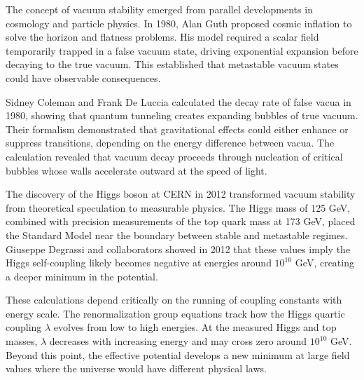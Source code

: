 \begin{historical}
The concept of vacuum stability emerged from parallel developments in cosmology and particle physics. In 1980, Alan Guth proposed cosmic inflation to solve the horizon and flatness problems. His model required a scalar field temporarily trapped in a false vacuum state, driving exponential expansion before decaying to the true vacuum. This established that metastable vacuum states could have observable consequences.

Sidney Coleman and Frank De Luccia calculated the decay rate of false vacua in 1980, showing that quantum tunneling creates expanding bubbles of true vacuum. Their formalism demonstrated that gravitational effects could either enhance or suppress transitions, depending on the energy difference between vacua. The calculation revealed that vacuum decay proceeds through nucleation of critical bubbles whose walls accelerate outward at the speed of light.

The discovery of the Higgs boson at CERN in 2012 transformed vacuum stability from theoretical speculation to measurable physics. The Higgs mass of 125 GeV, combined with precision measurements of the top quark mass at 173 GeV, placed the Standard Model near the boundary between stable and metastable regimes. Giuseppe Degrassi and collaborators showed in 2012 that these values imply the Higgs self-coupling likely becomes negative at energies around $10^{10}$ GeV, creating a deeper minimum in the potential.

These calculations depend critically on the running of coupling constants with energy scale. The renormalization group equations track how the Higgs quartic coupling $\lambda$ evolves from low to high energies. At the measured Higgs and top masses, $\lambda$ decreases with increasing energy and may cross zero around $10^{10}$ GeV. Beyond this point, the effective potential develops a new minimum at large field values where the universe would have different physical laws.
\end{historical}